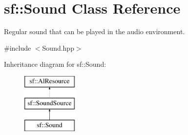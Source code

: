\hypertarget{classsf_1_1_sound}{}\section{sf\+:\+:Sound Class Reference}
\label{classsf_1_1_sound}


Regular sound that can be played in the audio environment.  




{\ttfamily \#include $<$Sound.\+hpp$>$}

Inheritance diagram for sf\+:\+:Sound\+:\begin{figure}[H]
\begin{center}
\leavevmode
\includegraphics[height=3.000000cm]{classsf_1_1_sound}
\end{center}
\end{figure}

